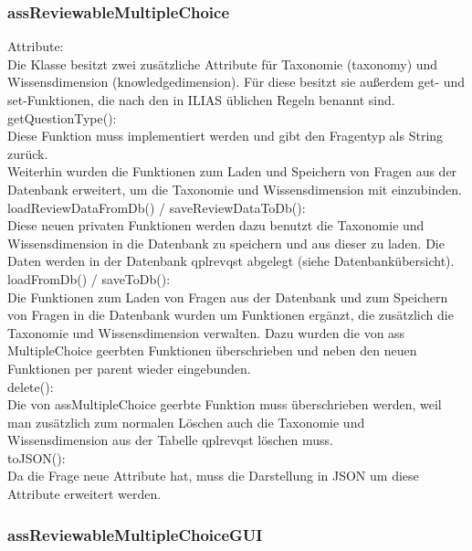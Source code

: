 \documentclass[a4paper]{scrreprt}
\begin{document}
\subsubsection{assReviewableMultipleChoice}

Attribute:\\
Die Klasse besitzt zwei zusätzliche Attribute für Taxonomie (taxonomy) und Wissensdimension (knowledge\textunderscore dimension).
Für diese besitzt sie außerdem get- und set-Funktionen, die nach den in ILIAS üblichen Regeln benannt sind.\\

getQuestionType():\\
Diese Funktion muss implementiert werden und gibt den Fragentyp als String zurück.\\
Weiterhin wurden die Funktionen zum Laden und Speichern von Fragen aus der Datenbank erweitert, um die Taxonomie und Wissensdimension mit einzubinden.\\

loadReviewDataFromDb() / saveReviewDataToDb():\\
Diese neuen privaten Funktionen werden dazu benutzt die Taxonomie und Wissensdimension in die Datenbank zu speichern und aus dieser zu laden.
Die Daten werden in der Datenbank qpl\textunderscore rev\textunderscore qst abgelegt (siehe Datenbankübersicht). \\

loadFromDb() / saveToDb():\\
Die Funktionen zum Laden von Fragen aus der Datenbank und zum Speichern von Fragen in die Datenbank wurden um Funktionen ergänzt, 
die zusätzlich die Taxonomie und Wissensdimension verwalten. 
Dazu wurden die von ass MultipleChoice geerbten Funktionen überschrieben und neben den neuen Funktionen per parent wieder eingebunden.\\

delete():\\
Die von assMultipleChoice geerbte Funktion muss überschrieben werden, weil man zusätzlich zum normalen Löschen auch die Taxonomie und Wissensdimension aus der Tabelle qpl\textunderscore rev\textunderscore qst löschen muss.\\

toJSON():\\
Da die Frage neue Attribute hat, muss die Darstellung in JSON um diese Attribute erweitert werden.\\


\subsubsection{assReviewableMultipleChoiceGUI}
\end{document}
